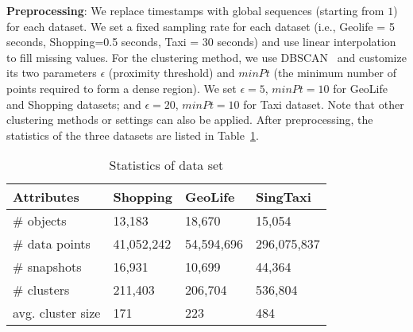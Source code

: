 \textbf{Preprocessing}: We replace timestamps with global sequences (starting from $1$) for each dataset. 
We set a fixed sampling rate for each dataset (i.e., Geolife = 5 seconds, Shopping=0.5 seconds, Taxi = 30 seconds)
and use linear interpolation to fill missing values.
For the clustering method, we use DBSCAN~\cite{ester1996density} and customize its two parameters $\epsilon$ (proximity threshold) and $minPt$ (the minimum number of points required to form a dense region). We set $\epsilon=5$, $minPt=10$ for GeoLife and Shopping datasets; and $\epsilon=20$, $minPt=10$ for Taxi dataset. Note that other clustering methods or settings can also be applied. 
After preprocessing, the statistics of the three datasets are listed in Table~\ref{exp:dataset}. 

\begin{table} [h]
\center
\small
\begin{tabular}{|l|l|l|l|}
\hline
 \textbf{Attributes}& \textbf{Shopping} &  \textbf{GeoLife} &  \textbf{SingTaxi} \\ 
\hline 
\# objects  & 13,183 & 18,670 & 15,054\\ 
\hline
\# data points  & 41,052,242 & 54,594,696 & 296,075,837\\ 
\hline
\# snapshots  & 16,931 & 10,699 & 44,364\\ 
\hline
\# clusters  & 211,403  & 206,704& 536,804\\
\hline
avg. cluster size  & 171 & 223 & 484\\
\hline
\end{tabular}
\caption{Statistics of data set}
\label{exp:dataset}
\end{table}

